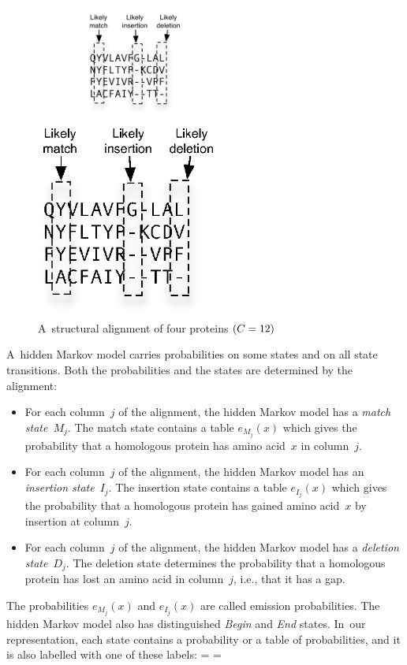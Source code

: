 \documentclass[nonatbib,preprint,blockstyle,times]{sigplanconf}
\newcommand\alignwidth{\ensuremath C} %
\newif\ifverbatimsmall
\newcommand\smallverbatiminput[1]{%
  \everypar=\expandafter{\the\everypar
       \verbatimsmallfalse
       \topsep=\standardvspace}%
  \topsep=0.78\topsep
  \verbatimsmalltrue}
\begin{document}
\begin{figure}
\ifpdfmadness
\centerline{\includegraphics[width=6cm]{alignment.pdf}} 
\else
\centerline{\includegraphics[width=6cm]{alignment.eps}} 
\fi

\caption{A~structural alignment of four proteins $(\alignwidth = 12)$}
\label{alignment} 
\end{figure}



A~hidden Markov model carries probabilities on some states and on all
state transitions.
Both the probabilities and the states are determined by the alignment:
\begin{itemize}
\item
For each column~$j$ of the alignment, the hidden Markov model has a
\emph{match state}~$M_j$.
The match state contains a table $e_{M_j}(x)$ which gives the
 probability that a homologous protein has amino acid~$x$ in
 column~$j$.
\item 
For each column~$j$ of the alignment, the hidden Markov model has an
\emph{insertion state}~$I_j$.
The insertion state contains a table $e_{I_j}(x)$ which gives the
probability that a homologous protein has gained amino acid~$x$ by
insertion at column~$j$.
\item
For each column~$j$ of the alignment, the hidden Markov model has a
\emph{deletion state}~$D_j$.
The deletion state determines the probability that a homologous protein
has lost an amino acid  in column~$j$, i.e., that it has a gap.
\end{itemize}
The probabilities $e_{M_j}(x)$ and $e_{I_j}(x)$ are called emission probabilities.
The hidden Markov model also has distinguished \emph{Begin} and \emph{End} states.
In~our representation, each state contains a probability or a table of
probabilities, and it is also labelled with one of these labels:
\smallverbatiminput{statelabel}
\end{document}
